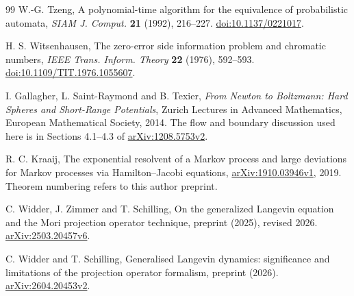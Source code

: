 \begin{thebibliography}{99}
W.-G. Tzeng, A polynomial-time algorithm for the equivalence of
probabilistic automata, \emph{SIAM J. Comput.} \textbf{21} (1992), 216--227.
\href{https://doi.org/10.1137/0221017}{doi:10.1137/0221017}.


H. S. Witsenhausen, The zero-error side information problem and chromatic
numbers, \emph{IEEE Trans. Inform. Theory} \textbf{22} (1976), 592--593.
\href{https://doi.org/10.1109/TIT.1976.1055607}{doi:10.1109/TIT.1976.1055607}.

I. Gallagher, L. Saint-Raymond and B. Texier,
\emph{From Newton to Boltzmann: Hard Spheres and Short-Range Potentials},
Zurich Lectures in Advanced Mathematics, European Mathematical Society, 2014.
The flow and boundary discussion used here is in Sections 4.1--4.3 of
\href{https://arxiv.org/abs/1208.5753v2}{arXiv:1208.5753v2}.

R. C. Kraaij, The exponential resolvent of a Markov process and large
deviations for Markov processes via Hamilton--Jacobi equations,
\href{https://arxiv.org/abs/1910.03946v1}{arXiv:1910.03946v1}, 2019.
Theorem numbering refers to this author preprint.


C. Widder, J. Zimmer and T. Schilling,
On the generalized Langevin equation and the Mori projection operator technique,
preprint (2025), revised 2026.
\href{https://arxiv.org/abs/2503.20457v6}{arXiv:2503.20457v6}.

C. Widder and T. Schilling,
Generalised Langevin dynamics: significance and limitations of the
projection operator formalism, preprint (2026).
\href{https://arxiv.org/abs/2604.20453v2}{arXiv:2604.20453v2}.

\end{thebibliography}
